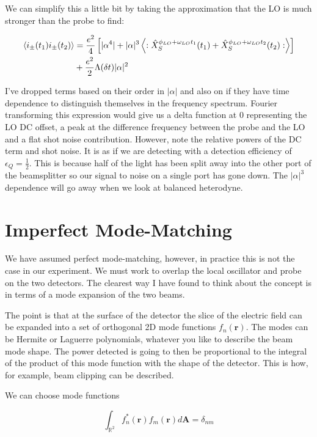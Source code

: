 \documentclass[12pt]{article}
\newcommand{\bv}[1]{\textbf{#1}}
\begin{document}
We can simplify this a little bit by taking the approximation that the LO is much stronger than the probe to find:

\begin{align}
\braket{i_{\pm}(t_1)i_{\pm}(t_2)} &= \frac{e^2}{4}\left[|\alpha^4| + |\alpha|^3 \left<:\hat{X}_{S}^{\phi_{LO}+\omega_{LO}t_1}(t_1)+\hat{X}_{S}^{\phi_{LO}+\omega_{LO}t_2}(t_2):\right>\right]\\
&+\frac{e^2}{2}\Lambda(\delta t)|\alpha|^2
\end{align}


I've dropped terms based on their order in $|\alpha|$ and also on if they have time dependence to distinguish themselves in the frequency spectrum. Fourier transforming this expression would give us a delta function at 0 representing the LO DC offset, a peak at the difference frequency between the probe and the LO and a flat shot noise contribution. However, note the relative powers of the DC term and shot noise. It is as if we are detecting with a detection efficiency of $\epsilon_Q=\frac{1}{2}$. This is because half of the light has been split away into the other port of the beamsplitter so our signal to noise on a single port has gone down. The $|\alpha|^3$ dependence will go away when we look at balanced heterodyne.

\section{Imperfect Mode-Matching}

We have assumed perfect mode-matching, however, in practice this is not the case in our experiment. We must work to overlap the local oscillator and probe on the two detectors. The clearest way I have found to think about the concept is in terms of a mode expansion of the two beams.

The point is that at the surface of the detector the slice of the electric field can be expanded into a set of orthogonal 2D mode functions $f_n(\bv{r})$. The modes can be Hermite or Laguerre polynomials, whatever you like to describe the beam mode shape. The power detected is going to then be proportional to the integral of the product of this mode function with the shape of the detector. This is how, for example, beam clipping can be described. 

We can choose mode functions

\begin{equation}
\int_{\mathbb{R}^2} f_n^*(\bv{r})f_m(\bv{r}) d\bv{A} = \delta_{nm}
\end{equation}
\end{document}
